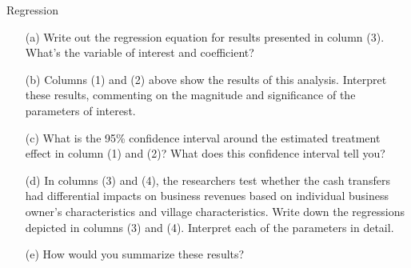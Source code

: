 \begin{homeworkProblem}{Regression}
    \begin{itemize}
        \item[(a)] Write out the regression equation for results presented in 
        column (3). What’s the variable of interest and coefficient?
        \item[(b)] Columns (1) and (2) above show the results of this analysis. 
        Interpret these results, commenting on the magnitude and significance 
        of the parameters of interest.
        \item[(c)] What is the 95\% confidence interval around the estimated 
        treatment effect in column (1) and (2)? What does this confidence 
        interval tell you?
        \item[(d)] In columns (3) and (4), the researchers test whether the 
        cash transfers had differential impacts on business revenues based on 
        individual business owner’s characteristics and village characteristics. 
        Write down the regressions depicted in columns (3) and (4). Interpret 
        each of the parameters in detail.
        \item[(e)] How would you summarize these results?
    \end{itemize}

    \begin{solution}
        

\end{solution}
\end{homeworkProblem}
